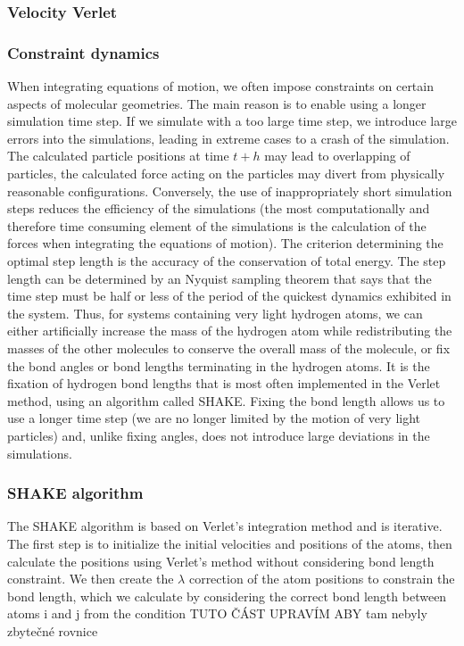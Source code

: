 \subsubsection{Velocity Verlet}

\subsubsection{Constraint dynamics}

When integrating equations of motion, we often impose constraints on certain aspects of molecular geometries. The main reason is to enable using a longer simulation time step. If we simulate with a too large time step, we introduce large errors into the simulations, leading in extreme cases to a crash of the simulation. The calculated particle positions at time $t+h$ may lead to overlapping of particles, the calculated force acting on the particles may divert from physically reasonable configurations. Conversely, the use of inappropriately short simulation steps reduces the efficiency of the simulations (the most computationally and therefore time consuming element of the simulations is the calculation of the forces when integrating the equations of motion). \cite{mdskripta} The criterion determining the optimal step length is the accuracy of the conservation of total energy. The step length can be determined by an Nyquist sampling theorem that says that the time step must be half or less of the period of the quickest dynamics exhibited in the system. Thus, for systems containing very light hydrogen atoms, we can either artificially increase the mass of the hydrogen atom while redistributing the masses of the other molecules to conserve the overall mass of the molecule, or fix the bond angles or bond lengths terminating in the hydrogen atoms. It is the fixation of hydrogen bond lengths that is most often implemented in the Verlet method, using an algorithm called SHAKE. Fixing the bond length allows us to use a longer time step (we are no longer limited by the motion of very light particles) and, unlike fixing angles, does not introduce large deviations in the simulations.

\subsubsection{SHAKE algorithm}

The SHAKE algorithm is based on Verlet's integration method and is iterative. The first step is to initialize the initial velocities and positions of the atoms, then calculate the positions using Verlet's method without considering bond length constraint. We then create the $\lambda$ correction of the atom positions to constrain the bond length, which we calculate by considering the correct bond length between atoms i and j from the condition 
TUTO ČÁST UPRAVÍM ABY tam nebyly zbytečné rovnice	

